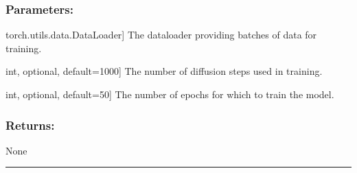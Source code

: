\documentclass[a4paper,10pt,english]{sphinxmanual}
\begin{document}
\begin{fulllineitems}
\begin{fulllineitems}
\subsubsection{Parameters:}
\label{\detokenize{models:id26}}\begin{description}
\sphinxlineitem{dataloader}{[}torch.utils.data.DataLoader{]}
\sphinxAtStartPar
The dataloader providing batches of data for training.

\sphinxlineitem{train\_steps}{[}int, optional, default=1000{]}
\sphinxAtStartPar
The number of diffusion steps used in training.

\sphinxlineitem{epochs}{[}int, optional, default=50{]}
\sphinxAtStartPar
The number of epochs for which to train the model.

\end{description}


\subsubsection{Returns:}
\label{\detokenize{models:id27}}
\sphinxAtStartPar
None

\end{fulllineitems}


\end{fulllineitems}



\bigskip\hrule\bigskip

\label{\detokenize{models:module-fireDiff.Models.deterministicmodel}}
\end{document}
